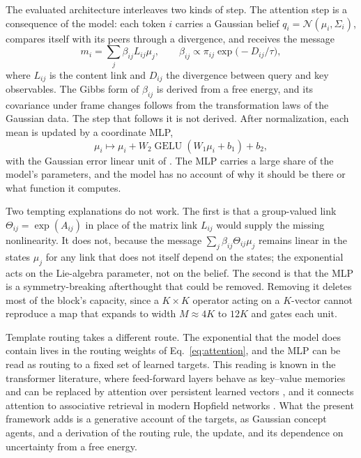 \documentclass[11pt]{article}
\theoremstyle{definition}
\theoremstyle{remark}
\newcommand{\N}{\mathcal{N}}
\begin{document}
The evaluated architecture interleaves two kinds of step. The attention step is a consequence of the model: each token $i$ carries a Gaussian belief $q_i=\N(\mu_i,\Sigma_i)$, compares itself with its peers through a divergence, and receives the message
\begin{equation}
m_i=\sum_j\beta_{ij}L_{ij}\mu_j,
\qquad
\beta_{ij}\propto\pi_{ij}\exp\bigl(-D_{ij}/\tau\bigr),
\label{eq:attention}
\end{equation}
where $L_{ij}$ is the content link and $D_{ij}$ the divergence between query and key observables. The Gibbs form of $\beta_{ij}$ is derived from a free energy, and its covariance under frame changes follows from the transformation laws of the Gaussian data. The step that follows it is not derived. After normalization, each mean is updated by a coordinate MLP,
\begin{equation}
\mu_i\mapsto\mu_i+W_2\operatorname{GELU}(W_1\mu_i+b_1)+b_2,
\label{eq:mlp}
\end{equation}
with the Gaussian error linear unit of \citet{hendrycks2016}. The MLP carries a large share of the model's parameters, and the model has no account of why it should be there or what function it computes.

Two tempting explanations do not work. The first is that a group-valued link $\Theta_{ij}=\exp(A_{ij})$ in place of the matrix link $L_{ij}$ would supply the missing nonlinearity. It does not, because the message $\sum_j\beta_{ij}\Theta_{ij}\mu_j$ remains linear in the states $\mu_j$ for any link that does not itself depend on the states; the exponential acts on the Lie-algebra parameter, not on the belief. The second is that the MLP is a symmetry-breaking afterthought that could be removed. Removing it deletes most of the block's capacity, since a $K\times K$ operator acting on a $K$-vector cannot reproduce a map that expands to width $M\approx 4K$ to $12K$ and gates each unit.

Template routing takes a different route. The exponential that the model does contain lives in the routing weights of Eq.~\eqref{eq:attention}, and the MLP can be read as routing to a fixed set of learned targets. This reading is known in the transformer literature, where feed-forward layers behave as key--value memories \citep{geva2021} and can be replaced by attention over persistent learned vectors \citep{sukhbaatar2019}, and it connects attention to associative retrieval in modern Hopfield networks \citep{ramsauer2021}. What the present framework adds is a generative account of the targets, as Gaussian concept agents, and a derivation of the routing rule, the update, and its dependence on uncertainty from a free energy.
\end{document}
